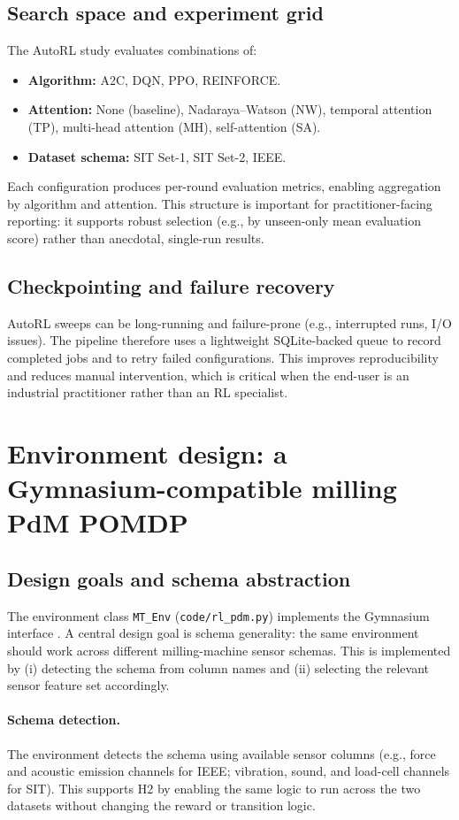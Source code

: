 \documentclass[11pt]{article}
\begin{document}
\subsection{Search space and experiment grid}
The AutoRL study evaluates combinations of:
\begin{itemize}
	\item \textbf{Algorithm:} A2C, DQN, PPO, REINFORCE.
	\item \textbf{Attention:} None (baseline), Nadaraya--Watson (NW), temporal attention (TP), multi-head attention (MH), self-attention (SA).
	\item \textbf{Dataset schema:} SIT Set-1, SIT Set-2, IEEE.
\end{itemize}
Each configuration produces per-round evaluation metrics, enabling aggregation by algorithm and attention. This structure is important for practitioner-facing reporting: it supports robust selection (e.g., by unseen-only mean evaluation score) rather than anecdotal, single-run results.

\subsection{Checkpointing and failure recovery}
AutoRL sweeps can be long-running and failure-prone (e.g., interrupted runs, I/O issues). The pipeline therefore uses a lightweight SQLite-backed queue to record completed jobs and to retry failed configurations. This improves reproducibility and reduces manual intervention, which is critical when the end-user is an industrial practitioner rather than an RL specialist.

\section{Environment design: a Gymnasium-compatible milling PdM POMDP}
\label{sec:env}
\subsection{Design goals and schema abstraction}
The environment class \texttt{MT\_Env} (\texttt{code/rl\_pdm.py}) implements the Gymnasium interface \parencite{Gymnasium2023}. A central design goal is schema generality: the same environment should work across different milling-machine sensor schemas. This is implemented by (i) detecting the schema from column names and (ii) selecting the relevant sensor feature set accordingly.

\paragraph{Schema detection.}
The environment detects the schema using available sensor columns (e.g., force and acoustic emission channels for IEEE; vibration, sound, and load-cell channels for SIT). This supports H2 by enabling the same logic to run across the two datasets without changing the reward or transition logic.
\end{document}
